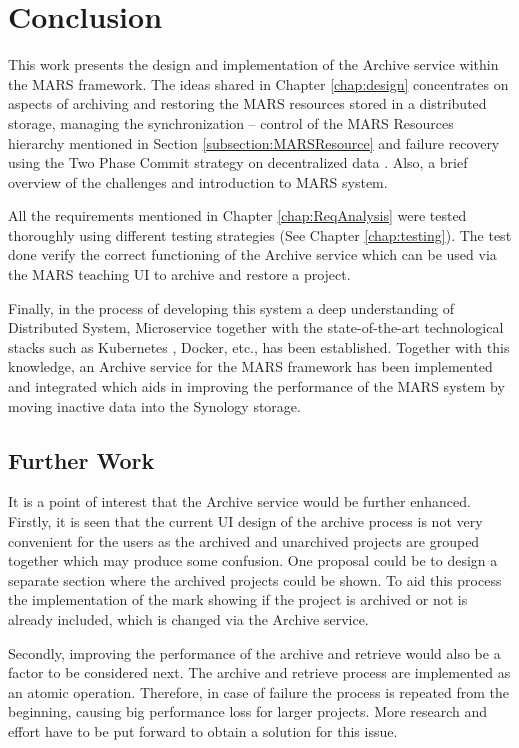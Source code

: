 \chapter{Conclusion}
This work presents the design and implementation of the Archive service within the MARS framework. The ideas shared
in Chapter \ref{chap:design} concentrates on aspects of archiving and restoring the MARS resources stored in a distributed storage, managing the synchronization
-- control of the MARS Resources hierarchy mentioned in Section \ref{subsection:MARSResource} and failure recovery using the Two Phase Commit strategy
on decentralized data \cite{atomic}.
Also, a brief overview of the challenges and introduction to MARS system.

All the requirements mentioned in Chapter \ref{chap:ReqAnalysis} were tested thoroughly using different testing strategies (See Chapter \ref{chap:testing}). The
test done verify the correct functioning of the Archive service which can be used via the MARS teaching UI to archive and restore a project.

Finally, in the process of developing this system a deep understanding of Distributed System, Microservice together with the state-of-the-art technological stacks
such as Kubernetes \cite{kubernetes}, Docker, etc., has been established. Together with this knowledge, an Archive service for the MARS framework has been implemented and integrated 
which aids in improving the performance of the MARS system by moving inactive data into the Synology storage.

\section{Further Work}
It is a point of interest that the Archive service would be further enhanced. Firstly, it is seen that the current UI design of the archive process is not very convenient
for the users as the archived and unarchived projects are grouped together which may produce some confusion. One proposal could be to design a separate section
where the archived projects could be shown. To aid this process the implementation of the mark showing if the project is archived or not is already included, which is
changed via the Archive service. 

Secondly, improving the performance of the archive and retrieve would also be a factor to be considered next. The archive and retrieve process are implemented as
an atomic operation. Therefore, in case of failure the process is repeated from the beginning, causing big performance loss for larger projects. More research and effort
have to be put forward to obtain a solution for this issue. 


